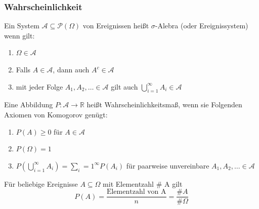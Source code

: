 \documentclass[
	ngerman,
	accentcolor=9c,%
	type=intern,
	marginpar=false
	]{tudapub}
\begin{document}
            \subsubsection{Wahrscheinlichkeit}
                \setcounter{satz}{3}
                \begin{definition}
                    Ein System $\mathscr{A} \subseteq \mathscr{P}(\Omega)$ von Ereignissen heißt $\sigma$-Alebra (oder Ereignissystem) wenn gilt:
                    \begin{enumerate}[label=\alph*)]
                        \item $\Omega \in \mathscr{A}$
                        \item Falls $A \in \mathscr{A}$, dann auch $A^c \in \mathscr{A}$
                        \item mit jeder Folge $A_1, A_2, \dots \in \mathscr{A}$ gilt auch $\bigcup^\infty_{i=1}A_i \in \mathscr{A}$
                    \end{enumerate}
                \end{definition}
                \setcounter{satz}{5}
                \begin{definition}
                    Eine Abbildung $P:\mathscr{A} \rightarrow \mathbb{R}$ heißt Wahrscheinlichkeitsmaß, wenn sie Folgenden Axiomen von Komogorov genügt:
                    \begin{enumerate}[label=\alph*)]
                        \item $P(A) \geq 0$ für $A \in \mathscr{A}$
                        \item $P(\Omega) = 1$
                        \item $P \left(\bigcup^\infty_{i=1}A_i\right)=\sum_i=1^\infty P(A_i)$ für paarweise unvereinbare $A_1,A_2, \dots \in \mathscr{A}$
                    \end{enumerate}
                \end{definition}

                Für beliebige Ereignisse $A \subseteq \Omega$ mit Elementzahl \# A gilt
                \begin{equation*}
                    P(A)= \dfrac{\text{Elementzahl von A}}{n} = \frac{\#A}{\#\Omega}
                \end{equation*}
\end{document}
